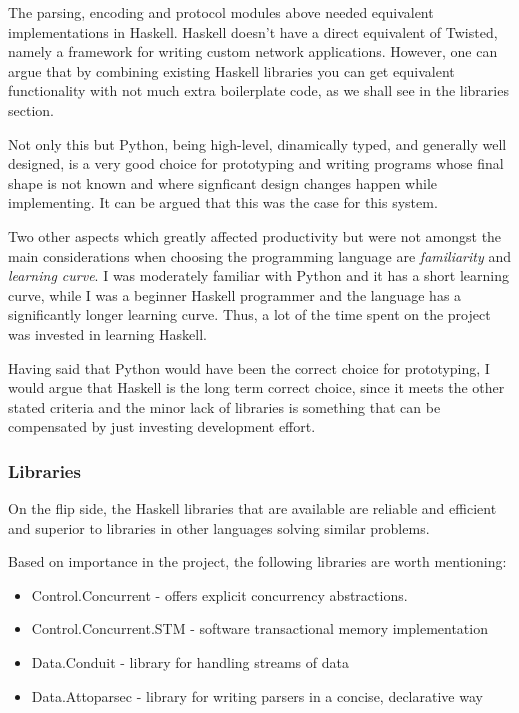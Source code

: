\documentclass[11pt]{article} %
\begin{document}
The parsing, encoding and protocol modules above needed equivalent implementations in Haskell.  Haskell doesn't have a direct equivalent of Twisted, namely a framework for writing custom network applications. However, one can argue that by combining existing Haskell libraries you can get equivalent functionality with not much extra boilerplate code, as we shall see in the libraries section.

Not only this but Python, being high-level, dinamically typed, and generally well designed, is a very good choice for prototyping and writing programs whose final shape is not known and where signficant design changes happen while implementing. It can be argued that this was the case for this system.

Two other aspects which greatly affected productivity but were not amongst the main considerations when choosing the programming language are \textit{familiarity} and \textit{learning curve}. I was moderately familiar with Python and it has a short learning curve, while I was a beginner Haskell programmer and the language has a significantly longer learning curve. Thus, a lot of the time spent on the project was invested in learning Haskell.

Having said that Python would have been the correct choice for prototyping, I would argue that Haskell is the long term correct choice, since it meets the other stated criteria and the minor lack of libraries is something that can be compensated by just investing development effort.

\subsubsection{Libraries}

On the flip side, the Haskell libraries that are available are reliable and efficient and superior to libraries in other languages solving similar problems.

Based on importance in the project, the following libraries are worth mentioning:

\begin{itemize}
\item  Control.Concurrent - offers explicit concurrency abstractions. 
\item Control.Concurrent.STM - software transactional memory implementation
\item Data.Conduit -  library for handling streams of data
\item Data.Attoparsec - library for writing parsers in a concise, declarative way
\end{itemize}
\end{document}
